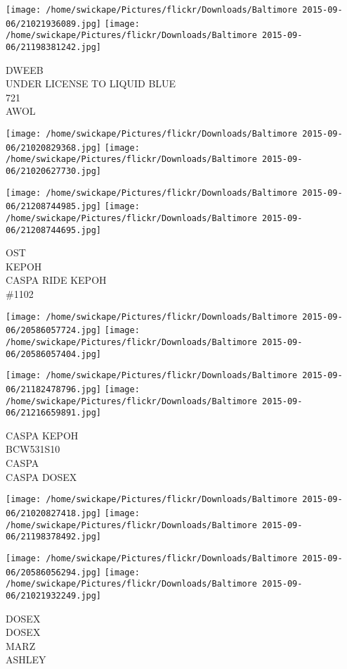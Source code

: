 \documentclass[10pt,letterpaper]{article}
\begin{document}
\texttt{[image: /home/swickape/Pictures/flickr/Downloads/Baltimore 2015-09-06/21021936089.jpg]}
\texttt{[image: /home/swickape/Pictures/flickr/Downloads/Baltimore 2015-09-06/21198381242.jpg]}

DWEEB\\
UNDER LICENSE TO LIQUID BLUE\\
721\\
AWOL
\pagebreak

\texttt{[image: /home/swickape/Pictures/flickr/Downloads/Baltimore 2015-09-06/21020829368.jpg]}
\texttt{[image: /home/swickape/Pictures/flickr/Downloads/Baltimore 2015-09-06/21020627730.jpg]}

\texttt{[image: /home/swickape/Pictures/flickr/Downloads/Baltimore 2015-09-06/21208744985.jpg]}
\texttt{[image: /home/swickape/Pictures/flickr/Downloads/Baltimore 2015-09-06/21208744695.jpg]}

OST\\
KEPOH\\
CASPA RIDE KEPOH\\
\#1102
\pagebreak

\texttt{[image: /home/swickape/Pictures/flickr/Downloads/Baltimore 2015-09-06/20586057724.jpg]}
\texttt{[image: /home/swickape/Pictures/flickr/Downloads/Baltimore 2015-09-06/20586057404.jpg]}

\texttt{[image: /home/swickape/Pictures/flickr/Downloads/Baltimore 2015-09-06/21182478796.jpg]}
\texttt{[image: /home/swickape/Pictures/flickr/Downloads/Baltimore 2015-09-06/21216659891.jpg]}

CASPA KEPOH\\
BCW531S10\\
CASPA\\
CASPA DOSEX
\pagebreak

\texttt{[image: /home/swickape/Pictures/flickr/Downloads/Baltimore 2015-09-06/21020827418.jpg]}
\texttt{[image: /home/swickape/Pictures/flickr/Downloads/Baltimore 2015-09-06/21198378492.jpg]}

\texttt{[image: /home/swickape/Pictures/flickr/Downloads/Baltimore 2015-09-06/20586056294.jpg]}
\texttt{[image: /home/swickape/Pictures/flickr/Downloads/Baltimore 2015-09-06/21021932249.jpg]}

DOSEX\\
DOSEX\\
MARZ\\
ASHLEY
\pagebreak
\end{document}
